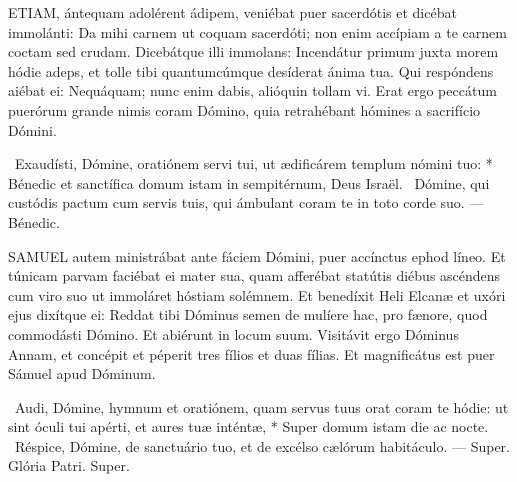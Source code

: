 \lettrine[lines=2]{E}{TIAM}, ántequam adolérent ádipem, veniébat puer sacerdótis et dicébat immolánti: Da mihi carnem ut coquam sacerdóti; non enim accípiam a te carnem coctam sed crudam. Dicebátque illi immolans: Incendátur primum juxta morem hódie adeps, et tolle tibi quantumcúmque desíderat ánima tua. Qui respóndens aiébat ei: Nequáquam; nunc enim dabis, alióquin tollam vi. Erat ergo peccátum puerórum grande nimis coram Dómino, quia retrahébant hómines a sacrifício Dómini.

\R\ Exaudísti, Dómine, oratiónem servi tui, ut ædificárem templum nómini tuo: * Bénedic et sanctífica domum istam in sempitérnum, Deus Israël. \V\ Dómine, qui custódis pactum cum servis tuis, qui ámbulant coram te in toto corde suo. --- Bénedic.



\lettrine[lines=2]{S}{AMUEL} autem ministrábat ante fáciem Dómini, puer accínctus ephod líneo. Et túnicam parvam faciébat ei mater sua, quam afferébat statútis diébus ascéndens cum viro suo ut immoláret hóstiam solémnem. Et benedíxit Heli Elcanæ et uxóri ejus dixítque ei: Reddat tibi Dóminus semen de mulíere hac, pro fænore, quod commodásti Dómino. Et abiérunt in locum suum. Visitávit ergo Dóminus Annam, et concépit et péperit tres fílios et duas fílias. Et magnificátus est puer Sámuel apud Dóminum.

\R\ Audi, Dómine, hymnum et oratiónem, quam servus tuus orat coram te hódie: ut sint óculi tui apérti, et aures tuæ inténtæ, * Super domum istam die ac nocte. \V\ Réspice, Dómine, de sanctuário tuo, et de excélso cælórum habitáculo. --- Super. Glória Patri. Super.



